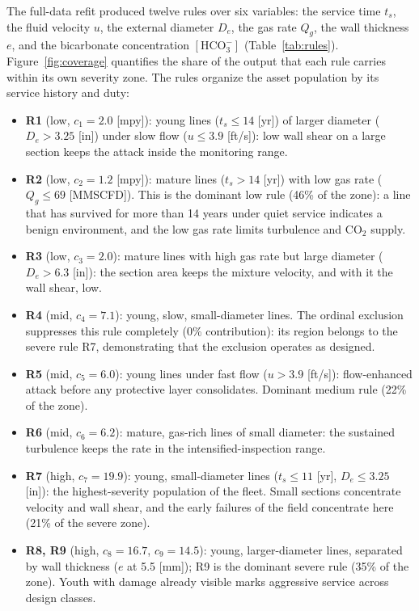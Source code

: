 The full-data refit produced twelve rules over six variables: the service time $t_s$, the fluid velocity $u$, the external diameter $D_e$, the gas rate $Q_g$, the wall thickness $e$, and the bicarbonate concentration $[\mathrm{HCO_3^-}]$ (Table~\ref{tab:rules}). Figure~\ref{fig:coverage} quantifies the share of the output that each rule carries within its own severity zone. The rules organize the asset population by its service history and duty:

\begin{itemize}
  \item \textbf{R1} (low, $c_1 = 2.0$ [mpy]): young lines ($t_s \leq 14$ [yr]) of larger diameter ($D_e > 3.25$ [in]) under slow flow ($u \leq 3.9$ [ft/s]): low wall shear on a large section keeps the attack inside the monitoring range.
  \item \textbf{R2} (low, $c_2 = 1.2$ [mpy]): mature lines ($t_s > 14$ [yr]) with low gas rate ($Q_g \leq 69$ [MMSCFD]). This is the dominant low rule (46\% of the zone): a line that has survived for more than 14 years under quiet service indicates a benign environment, and the low gas rate limits turbulence and CO$_2$ supply.
  \item \textbf{R3} (low, $c_3 = 2.0$): mature lines with high gas rate but large diameter ($D_e > 6.3$ [in]): the section area keeps the mixture velocity, and with it the wall shear, low.
  \item \textbf{R4} (mid, $c_4 = 7.1$): young, slow, small-diameter lines. The ordinal exclusion suppresses this rule completely (0\% contribution): its region belongs to the severe rule R7, demonstrating that the exclusion operates as designed.
  \item \textbf{R5} (mid, $c_5 = 6.0$): young lines under fast flow ($u > 3.9$ [ft/s]): flow-enhanced attack before any protective layer consolidates. Dominant medium rule (22\% of the zone).
  \item \textbf{R6} (mid, $c_6 = 6.2$): mature, gas-rich lines of small diameter: the sustained turbulence keeps the rate in the intensified-inspection range.
  \item \textbf{R7} (high, $c_7 = 19.9$): young, small-diameter lines ($t_s \leq 11$ [yr], $D_e \leq 3.25$ [in]): the highest-severity population of the fleet. Small sections concentrate velocity and wall shear, and the early failures of the field concentrate here (21\% of the severe zone).
  \item \textbf{R8, R9} (high, $c_8 = 16.7$, $c_9 = 14.5$): young, larger-diameter lines, separated by wall thickness ($e$ at 5.5 [mm]); R9 is the dominant severe rule (35\% of the zone). Youth with damage already visible marks aggressive service across design classes.

\end{itemize}
